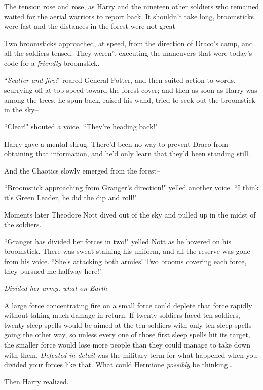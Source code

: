 \later

The tension rose and rose, as Harry and the nineteen other soldiers who remained waited for the aerial warriors to report back. It shouldn't take long, broomsticks were fast and the distances in the forest were not great\---

Two broomsticks approached, at speed, from the direction of Draco's camp, and all the soldiers tensed. They weren't executing the maneuvers that were today's code for a \emph{friendly} broomstick.

``\emph{Scatter and fire!}" roared General Potter, and then suited action to words, scurrying off at top speed toward the forest cover; and then as soon as Harry was among the trees, he spun back, raised his wand, tried to seek out the broomstick in the sky\---

``Clear!" shouted a voice. ``They're heading back!"

Harry gave a mental shrug. There'd been no way to prevent Draco from obtaining that information, and he'd only learn that they'd been standing still.

And the Chaotics slowly emerged from the forest\---

``Broomstick approaching from Granger's direction!" yelled another voice. ``I think it's Green Leader, he did the dip and roll!"

Moments later Theodore Nott dived out of the sky and pulled up in the midst of the soldiers.

``Granger has divided her forces in two!" yelled Nott as he hovered on his broomstick. There was sweat staining his uniform, and all the reserve was gone from his voice. ``She's attacking both armies! Two brooms covering each force, they pursued me halfway here!"

\emph{Divided her army, what on Earth\---}

A large force concentrating fire on a small force could deplete that force rapidly without taking much damage in return. If twenty soldiers faced ten soldiers, twenty sleep spells would be aimed at the ten soldiers with only ten sleep spells going the other way, so unless every one of those first sleep spells hit its target, the smaller force would lose more people than they could manage to take down with them. \emph{Defeated in detail} was the military term for what happened when you divided your forces like that. What could Hermione \emph{possibly} be thinking{\ldots}

Then Harry realized.

